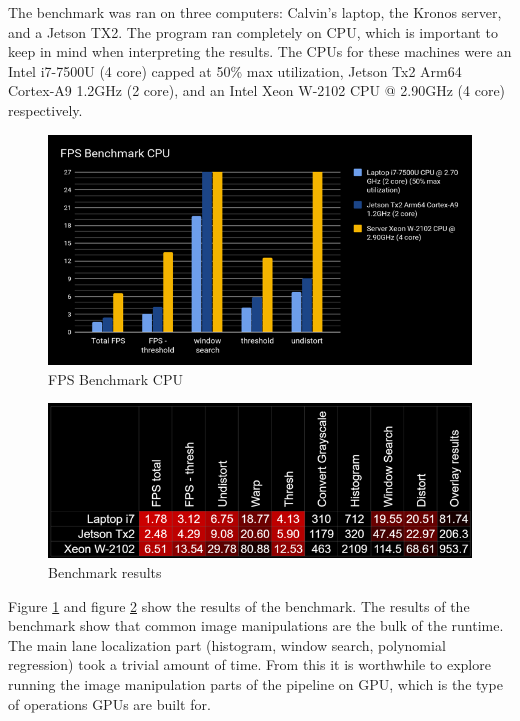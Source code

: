\documentclass[twoside,twocolumn]{article}
\begin{document}
\par The benchmark was ran on three computers: Calvin's laptop, the Kronos server, and a Jetson TX2. The program ran completely on CPU, which is important to keep in mind when interpreting the results. The CPUs for these machines were an Intel i7-7500U (4 core) capped at 50\% max utilization, Jetson Tx2 Arm64 Cortex-A9 1.2GHz (2 core), and an Intel Xeon W-2102 CPU @ 2.90GHz (4 core) respectively.


\begin{figure}
  \includegraphics[width=\linewidth]{calvin1.png}
  \caption{FPS Benchmark CPU}
  \label{fig:cpu}
\end{figure}

\begin{figure}
  \includegraphics[width=\linewidth]{calvin2.png}
  \caption{Benchmark results}
  \label{fig:benchmark}
\end{figure}


\par Figure \ref{fig:cpu} and figure \ref{fig:benchmark} show the results of the benchmark. The results of the benchmark show that common image manipulations are the bulk of the runtime. The main lane localization part (histogram, window search, polynomial regression) took a trivial amount of time. From this it is worthwhile to explore running the image manipulation parts of the pipeline on GPU, which is the type of operations GPUs are built for.
\end{document}
